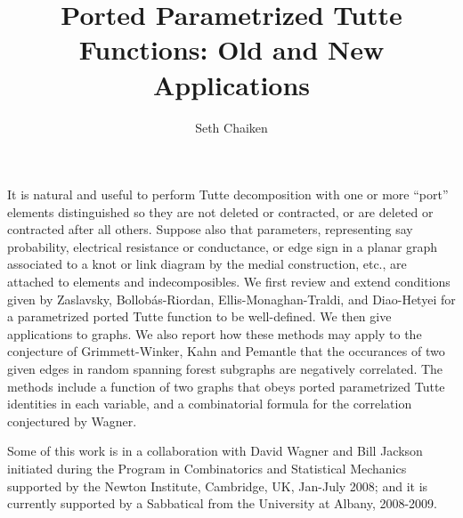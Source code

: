 \documentclass{amsart}
\title{Ported Parametrized Tutte Functions: Old and New Applications}
\author{Seth Chaiken}
\begin{document}
\maketitle

It is natural and useful to perform Tutte decomposition with
one or more ``port'' elements distinguished so they are not
deleted or contracted, or are deleted or contracted after all others.
Suppose also that parameters, representing say probability, electrical
resistance or conductance, or edge sign in a planar graph associated to
a knot or link diagram by the medial construction, etc., are attached to 
elements and indecomposibles.  We first review and extend conditions
given by Zaslavsky, Bollob\'{a}s-Riordan, Ellis-Monaghan-Traldi, and 
Diao-Hetyei for a parametrized ported Tutte function to be well-defined.
We then give applications to graphs.  We also report how these
methods may apply to the conjecture of Grimmett-Winker, Kahn and Pemantle
that the occurances of two given edges in random spanning forest subgraphs
are negatively correlated.  The methods include a function of two graphs
that obeys ported parametrized Tutte identities in each variable, and
a combinatorial formula for the correlation conjectured by Wagner.

Some of this work is in a collaboration with David Wagner and Bill Jackson
initiated during the Program in Combinatorics and Statistical Mechanics
supported by the Newton Institute, Cambridge, UK, Jan-July 2008; and it is
currently supported by a Sabbatical from the University at Albany, 2008-2009.
\end{document}
